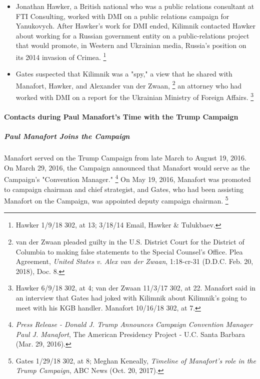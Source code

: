 \begin{itemize}
    \item Jonathan Hawker, a British national who was a public relations consultant at FTI Consulting, worked with DMI on a public relations campaign for Yanukovych.
    After Hawker's work for DMI ended, Kilimnik contacted Hawker about working for a Russian government entity on a public-relations project that would promote, in Western and Ukrainian media, Russia's position on its 2014 invasion of Crimea.%
\footnote{Hawker 1/9/18 302, at 13;
3/18/14 Email, Hawker \& Tulukbaev.}

    \item Gates suspected that Kilimnik was a "spy," a view that he shared with Manafort, Hawker, and Alexander van der Zwaan,%
\footnote{van der Zwaan pleaded guilty in the U.S. District Court for the District of Columbia to making false statements to the Special Counsel’s Office.
Plea Agreement, \textit{United States v. Alex van der Zwaan}, 1:18-cr-31 (D.D.C. Feb. 20, 2018), Doc. 8.}
    an attorney who had worked with DMI on a report for the Ukrainian Ministry of Foreign Affairs.%
\footnote{Hawker 6/9/18 302, at 4;
van der Zwaan 11/3/17 302, at 22.
Manafort said in an interview that Gates had joked with Kilimnik about Kilimnik's going to meet with his KGB handler.
Manafort 10/16/18 302, at 7.}
\end{itemize}


\paragraph{Contacts during Paul Manafort's Time with the Trump Campaign}

\subparagraph{Paul Manafort Joins the Campaign}

Manafort served on the Trump Campaign from late March to August 19, 2016.
On March 29, 2016, the Campaign announced that Manafort would serve as the Campaign's "Convention Manager."%
\footnote{\textit{Press Release - Donald J. Trump Announces Campaign Convention Manager Paul J. Manafort}, The American Presidency Project - U.C. Santa Barbara (Mar. 29, 2016).}
On May 19, 2016, Manafort was promoted to campaign chairman and chief strategist, and Gates, who had been assisting Manafort on the Campaign, was appointed deputy campaign chairman.%
\footnote{Gates 1/29/18 302, at 8; Meghan Keneally, \textit{Timeline of Manafort’s role in the Trump Campaign}, ABC News (Oct. 20, 2017).}

